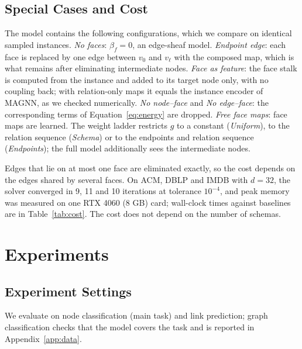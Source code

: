 \documentclass{article}
\begin{document}
\subsection{Special Cases and Cost}
\label{sec:cases}
The model contains the following configurations, which we compare on identical sampled instances. \emph{No faces}: $\beta_f=0$, an edge-sheaf model. \emph{Endpoint edge}: each face is replaced by one edge between $v_0$ and $v_\ell$ with the composed map, which is what remains after eliminating intermediate nodes. \emph{Face as feature}: the face stalk is computed from the instance and added to its target node only, with no coupling back; with relation-only maps it equals the instance encoder of MAGNN, as we checked numerically. \emph{No node--face} and \emph{No edge--face}: the corresponding terms of Equation~\eqref{eq:energy} are dropped. \emph{Free face maps}: face maps are learned. The weight ladder restricts $g$ to a constant (\emph{Uniform}), to the relation sequence (\emph{Schema}) or to the endpoints and relation sequence (\emph{Endpoints}); the full model additionally sees the intermediate nodes.

Edges that lie on at most one face are eliminated exactly, so the cost depends on the edges shared by several faces. On ACM, DBLP and IMDB with $d=32$, the solver converged in 9, 11 and 10 iterations at tolerance $10^{-4}$, and peak memory was measured on one RTX 4060 (8 GB) card; wall-clock times against baselines are in Table~\ref{tab:cost}. The cost does not depend on the number of schemas.

\section{Experiments}
\label{sec:experiments}

\subsection{Experiment Settings}
We evaluate on node classification (main task) and link prediction; graph classification checks that the model covers the task and is reported in Appendix~\ref{app:data}.
\end{document}
